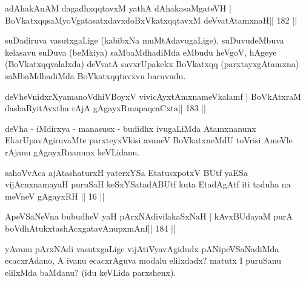 
\begin{shl}
adAhakAnAM dagadhxqqtavxM yathA dAhakasaMgateVH |
BoVkatxqqsaMyoVgatasatxdavxdoBxVkatxqqtavxM deVvatAtamxnaH\hfill || 182 ||
\end{shl}

\begin{artha}
suDadiruva vasutxgaLige (kabibxNa muMtAdavugaLige), suDuvudeMbuva kelasavu suDuva (beMkiya) saMbaMdhadiMda eMbudu heVgoV, hAgeye (BoVkatxqqvalalxda) deVvatA savxrUpakekx BoVkatxqq (parxtayxgAtamxna) saMbaMdhadiMda BoVkatxqqtavxvu baruvudu.
\end{artha}


\begin{shl}
deVheVnidxrXyamanoVdhiVBoyxV vivicAyx\s\s tAmxnameVkalamf |
BoVkAtxraM dashaRyitAvx\s tha rAjA gAgayxRmapaqcaCxta\hfill || 183 ||
\end{shl}

\begin{artha}
deVha - iMdirxya - manasusx - budidhx ivugaLiMda Atamxnanunx EkarUpavAgi\-ruvaMte parxteyxVkisi avaneV BoVkatxneMdU toVrisi AmeVle rAjanu gAgayxRnanunx keVLidanu.
\end{artha}


\begin{shl}
sahoVvAca ajAtashaturxH yaterxYSa EtatusxpotxV\s
BUtf yaESa vijAcnxnamayaH puruSaH keSxYSatadABUtf
kuta EtadAgAtf iti taduha na meVneV gAgayxRH || 16 ||
\end{shl}

\begin{shl}
ApeVSaNeVna bubudheV yaH pArxNAdivilakaSxNaH |
kAvxBUdayaM purA boVdhAtukxtashAcx\s\s gatavAnupxmAnf\hfill || 184 ||
\end{shl}

\begin{artha}
yAvanu pArxNAdi vasutxgaLige vijAtiVyavAgidudx pANipeVSaNadiMda  ecacxrAdano, A ivanu ecacxrAguva modalu elilxdadx? matutx I puruSanu elilxMda baMdanu? (idu keVLida parxshenx).
\end{artha}


